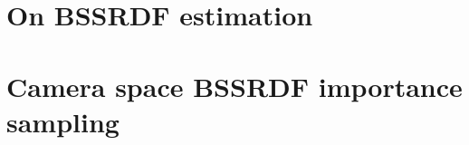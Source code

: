 \chapter{On BSSRDF estimation}
\label{sec:bssrdfnote}

%
%
%
\chapter{Camera space BSSRDF importance sampling}
\label{sec:mertensnote}


